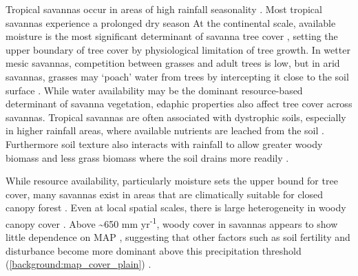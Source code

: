 \begin{refsection}
Tropical savannas occur in areas of high rainfall seasonality \citep{Lehmann2011}. Most tropical savannas experience a prolonged dry season At the continental scale, available moisture is the most significant determinant of savanna tree cover \citep{Sankaran2005}, setting the upper boundary of tree cover by physiological limitation of tree growth. In wetter mesic savannas, competition between grasses and adult trees is low, but in arid savannas, grasses may `poach' water from trees by intercepting it close to the soil surface \citep{Scheiter2007}. While water availability may be the dominant resource-based determinant of savanna vegetation, edaphic properties also affect tree cover across savannas. Tropical savannas are often associated with dystrophic soils, especially in higher rainfall areas, where available nutrients are leached from the soil \citep{February2013}. Furthermore soil texture also interacts with rainfall to allow greater woody biomass and less grass biomass where the soil drains more readily \citep{Staver2011}. 

While resource availability, particularly moisture sets the upper bound for tree cover, many savannas exist in areas that are climatically suitable for closed canopy forest \citep{Sankaran2005, Lehmann2011, Staver2011, Murphy2012}. Even at local spatial scales, there is large heterogeneity in woody canopy cover \citep{Dantas2015}. Above \textasciitilde{}650 mm yr\textsuperscript{-1}, woody cover in savannas appears to show little dependence on MAP \citep{Sankaran2008, Sankaran2005, Good2011}, suggesting that other factors such as soil fertility and disturbance become more dominant above this precipitation threshold (\autoref{background:map_cover_plain}) \citep{Staver2011}. 


\end{refsection}

